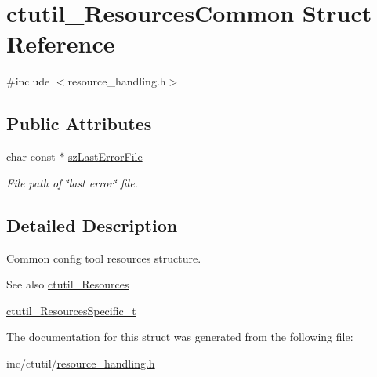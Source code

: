 \hypertarget{structctutil__ResourcesCommon}{}\section{ctutil\+\_\+\+Resources\+Common Struct Reference}
\label{structctutil__ResourcesCommon}


{\ttfamily \#include $<$resource\+\_\+handling.\+h$>$}

\subsection*{Public Attributes}
\begin{DoxyCompactItemize}
\item 
\hypertarget{structctutil__ResourcesCommon_a82619191e218be0a9e90c3fed0a76d85}{}\label{structctutil__ResourcesCommon_a82619191e218be0a9e90c3fed0a76d85} 
char const  $\ast$ \hyperlink{structctutil__ResourcesCommon_a82619191e218be0a9e90c3fed0a76d85}{sz\+Last\+Error\+File}
\begin{DoxyCompactList}\small\item\em File path of \char`\"{}last error\char`\"{} file. \end{DoxyCompactList}\end{DoxyCompactItemize}


\subsection{Detailed Description}
Common config tool resources structure. \begin{DoxySeeAlso}{See also}
\hyperlink{structctutil__Resources}{ctutil\+\_\+\+Resources} 

\hyperlink{resource__handling_8h_a19efb53c32f9b0e36d22639f6855b502}{ctutil\+\_\+\+Resources\+Specific\+\_\+t} 
\end{DoxySeeAlso}


The documentation for this struct was generated from the following file\+:\begin{DoxyCompactItemize}
\item 
inc/ctutil/\hyperlink{resource__handling_8h}{resource\+\_\+handling.\+h}\end{DoxyCompactItemize}
